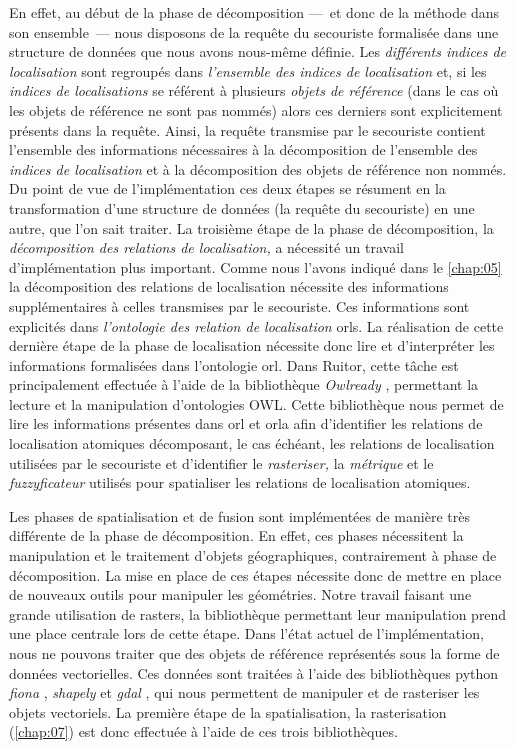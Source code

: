 En effet, au début de la phase de décomposition ---~et donc de la
méthode dans son ensemble~--- nous disposons de la requête du
secouriste formalisée dans une structure de données que nous avons
nous-même définie. Les \emph{différents indices de localisation} sont
regroupés dans \emph{l'ensemble des indices de localisation} et, si
les \emph{indices de localisations} se référent à plusieurs
\emph{objets de référence} (\ie dans le cas où les objets de référence
ne sont pas nommés) alors ces derniers sont explicitement présents
dans la requête. Ainsi, la requête transmise par le secouriste
contient l'ensemble des informations nécessaires à la décomposition de
l'ensemble des \emph{indices de localisation} et à la décomposition
des objets de référence non nommés. Du point de vue de
l'implémentation ces deux étapes se résument en la transformation
d'une structure de données (la requête du secouriste) en une autre,
que l'on sait traiter. La troisième étape de la phase de
décomposition, la \emph{décomposition des relations de localisation,}
a nécessité un travail d'implémentation plus important. Comme nous
l'avons indiqué dans le \autoref{chap:05} la décomposition des
relations de localisation nécessite des informations supplémentaires à
celles transmises par le secouriste. Ces informations sont explicités
dans \emph{l'ontologie des relation de localisation} \acp{orl}. La
réalisation de cette dernière étape de la phase de localisation
nécessite donc lire et d'interpréter les informations formalisées dans
l'ontologie \ac{orl}. Dans Ruitor, cette tâche est principalement
effectuée à l'aide de la bibliothèque \emph{Owlready}
\autocite{Lamy2017}, permettant la lecture et la manipulation
d'ontologies OWL. Cette bibliothèque nous permet de lire les
informations présentes dans \ac{orl} et \ac{orla} afin d'identifier
les relations de localisation atomiques décomposant, le cas échéant,
les relations de localisation utilisées par le secouriste et
d'identifier le \emph{rasteriser,} la \emph{métrique} et le
\emph{fuzzyficateur} utilisés pour spatialiser les relations de
localisation atomiques. 

Les phases de spatialisation et de fusion sont implémentées de manière
très différente de la phase de décomposition. En effet, ces phases
nécessitent la manipulation et le traitement d'objets géographiques,
contrairement à phase de décomposition. La mise en place de ces étapes
nécessite donc de mettre en place de nouveaux outils pour manipuler
les géométries. Notre travail faisant une grande utilisation de
rasters, la bibliothèque permettant leur manipulation prend une place
centrale lors de cette étape. Dans l'état actuel de l'implémentation,
nous ne pouvons traiter que des objets de référence représentés sous
la forme de données vectorielles. Ces données sont traitées à l'aide
des bibliothèques python \emph{fiona} \autocite{Gillies2020a},
\emph{shapely} \autocite{Gillies2020} et \emph{gdal}
\autocite{GDAL2020}, qui nous permettent de manipuler et de rasteriser
les objets vectoriels. La première étape de la spatialisation, la
rasterisation (\autoref{chap:07}) est donc effectuée à l'aide de ces
trois bibliothèques.

